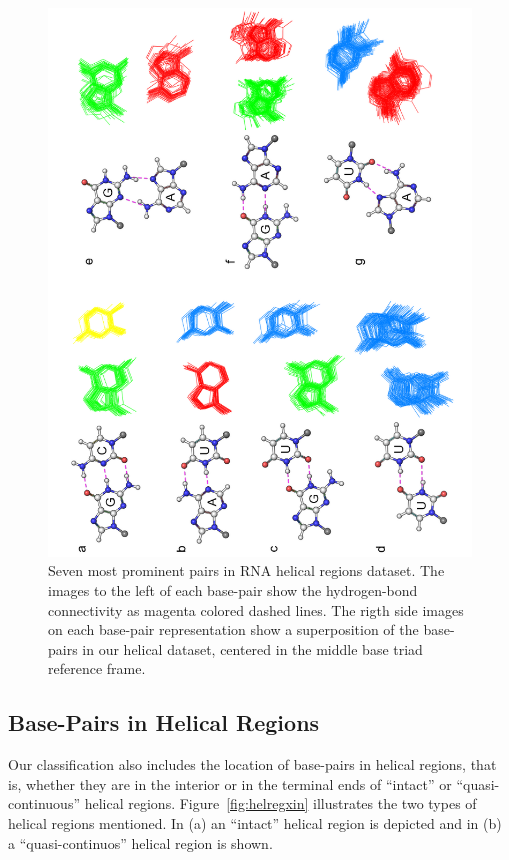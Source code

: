 \begin{figure}[htbp]
\centering
\includegraphics[scale=1.1]{Chapter3/sevenpairs.png}
\caption{Seven   most   prominent  pairs   in   RNA  helical   regions
  dataset.  The  images  to  the  left  of  each  base-pair  show  the
  hydrogen-bond  connectivity  as magenta  colored  dashed lines.  The
  rigth  side   images  on   each  base-pair  representation   show  a
  superposition of the base-pairs  in our helical dataset, centered in
  the middle base triad reference frame. }
\label{fig:pairs}
\end{figure}

\subsection{Base-Pairs in Helical Regions}
Our classification also includes the location of base-pairs in helical
regions, that is, whether they are  in the interior or in the terminal
ends     of     ``intact''     or     ``quasi-continuous''     helical
regions.  Figure~\ref{fig:helregxin}  illustrates  the  two  types  of
helical regions  mentioned. In (a) an  ``intact'' helical region
is depicted and in (b) a ``quasi-continuos'' helical region is shown.

